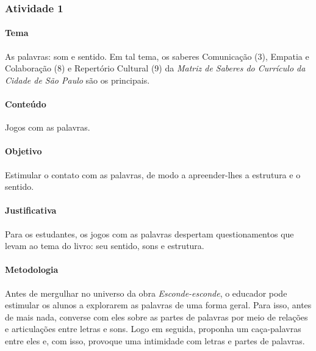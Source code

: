 \documentclass[11pt]{extarticle}
\begin{document}
\subsubsection{Atividade 1}



\paragraph{Tema} As palavras: som e sentido. Em tal tema, os saberes Comunicação (3), Empatia e Colaboração (8) e Repertório Cultural (9) da \textit{Matriz de Saberes do Currículo da Cidade de São Paulo} são os principais.

\paragraph{Conteúdo} Jogos com as palavras. 

\paragraph{Objetivo} Estimular o contato com as palavras, de modo a apreender-lhes a estrutura e o sentido. 

\paragraph{Justificativa} Para os estudantes, os jogos com as palavras despertam questionamentos que levam ao tema do livro: seu sentido, sons e estrutura.   

\paragraph{Metodologia} Antes de mergulhar no universo da obra \textit{Esconde-esconde}, o educador pode estimular os alunos a explorarem as palavras de uma forma geral. Para isso, antes de mais nada, converse com eles sobre as partes de palavras por meio de relações e articulações entre letras e sons. Logo em seguida, proponha um caça-palavras entre eles e, com isso, provoque uma intimidade com letras e partes de palavras. 

\end{document}
